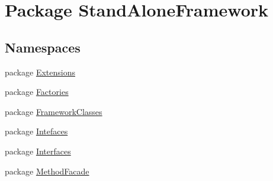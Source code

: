 \hypertarget{namespace_stand_alone_framework}{\section{Package Stand\+Alone\+Framework}
\label{namespace_stand_alone_framework}
}
\subsection*{Namespaces}
\begin{DoxyCompactItemize}
\item 
package \hyperlink{namespace_stand_alone_framework_1_1_extensions}{Extensions}
\item 
package \hyperlink{namespace_stand_alone_framework_1_1_factories}{Factories}
\item 
package \hyperlink{namespace_stand_alone_framework_1_1_framework_classes}{Framework\+Classes}
\item 
package \hyperlink{namespace_stand_alone_framework_1_1_intefaces}{Intefaces}
\item 
package \hyperlink{namespace_stand_alone_framework_1_1_interfaces}{Interfaces}
\item 
package \hyperlink{namespace_stand_alone_framework_1_1_method_facade}{Method\+Facade}
\end{DoxyCompactItemize}
